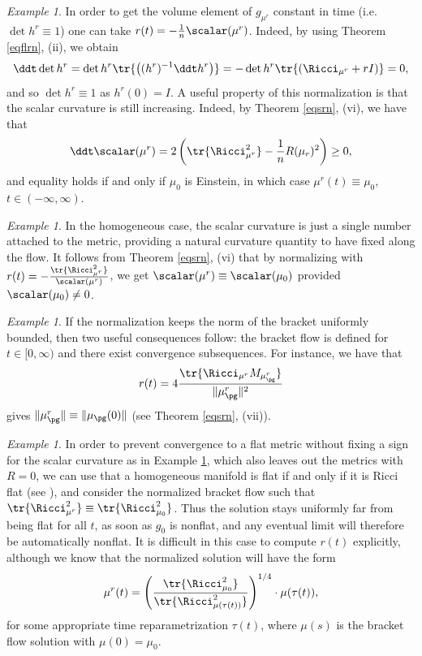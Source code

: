 \documentclass[11pt]{amsart}
\theoremstyle{plain}
\theoremstyle{definition}
\theoremstyle{remark}
\newtheorem{example}[theorem]{Example}
\begin{document}
\begin{example}\label{norm-vol}
In order to get the volume element of $g_{\mu^r}$ constant in time (i.e. $\det{h^r}\equiv 1$) one can take $r(t)=-\frac{1}{n}\scalar(\mu^r)$.  Indeed, by using Theorem \ref{eqflrn}, (ii), we obtain
$$
\ddt\det{h^r} = \det{h^r}\tr{\left((h^r)^{-1}\ddt h^r\right)} = -\det{h^r}\tr{(\Ricci_{\mu^r}+rI)}=0,
$$
and so $\det{h^r}\equiv 1$ as $h^r(0)=I$.  A useful property of this normalization is that the scalar curvature is still increasing. Indeed, by Theorem \ref{eqsrn}, (vi), we have that
$$
\ddt\scalar(\mu^r)= 2\left(\tr{\Ricci_{\mu^r}^2} - \frac{1}{n}R(\mu_r)^2\right) \geq 0,
$$
and equality holds if and only if $\mu_0$ is Einstein, in which case $\mu^r(t)\equiv\mu_0$, $t\in(-\infty,\infty)$.
\end{example}


\begin{example}\label{norm-R}
In the homogeneous case, the scalar curvature is just a single number attached to the metric, providing a natural curvature quantity to have fixed along the flow.  It follows from Theorem \ref{eqsrn}, (vi) that by normalizing with $r(t)=-\frac{\tr{\Ricci_{\mu^r}^2}}{\scalar(\mu^r)}$, we get $\scalar(\mu^r)\equiv\scalar(\mu_0)$  provided $\scalar(\mu_0)\ne 0$.
\end{example}


\begin{example}\label{norm-norma}
If the normalization keeps the norm of the bracket uniformly bounded, then two useful consequences follow: the bracket flow is defined for $t\in[0,\infty)$ and there exist convergence subsequences.  For instance, we have that
$$
r(t)=4\frac{\tr{\Ricci_{\mu^r}M_{\mu_{\pg}^r}}}{\|\mu_{\pg}^r\|^2}
$$
gives $\|\mu_{\pg}^r\|\equiv \|\mu_{\pg}(0)\|$ (see Theorem \ref{eqsrn}, (vii)).
\end{example}


\begin{example}\label{norm-Ric}
In order to prevent convergence to a flat metric without fixing a sign for the scalar curvature as in Example \ref{norm-R}, which also leaves out the metrics with $R=0$, we can use that a homogeneous manifold is flat if and only if it is Ricci flat (see \cite{AlkKml}), and consider the normalized bracket flow such that  $\tr{\Ricci_{\mu^r}^2}\equiv \tr{\Ricci_{\mu_0}^2}$.  Thus the solution stays uniformly far from being flat for all $t$, as soon as $g_0$ is nonflat, and any eventual limit will therefore be automatically nonflat.  It is difficult in this case to compute $r(t)$ explicitly, although we know that the normalized solution will have the form
$$
\mu^r(t)=\left(\frac{\tr{\Ricci_{\mu_0}^2}}{\tr{\Ricci_{\mu(\tau(t))}^2}}\right)^{1/4}\cdot\mu(\tau(t)),
$$
for some appropriate time reparametrization $\tau(t)$, where $\mu(s)$ is the bracket flow solution with $\mu(0)=\mu_0$.
\end{example}
\end{document}
